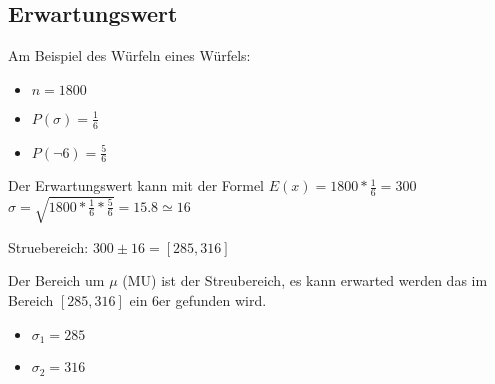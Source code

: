 \newpage
\subsection{Erwartungswert}


Am Beispiel des Würfeln eines Würfels:\\

\begin{itemize}
    \item $n=1800$
    \item $P(\sigma) = \frac{1}{6}$
    \item $P(\lnot 6) = \frac{5}{6}$
\end{itemize}

Der Erwartungswert kann mit der Formel $E(x)=1800 * \frac{1}{6} = 300$\\
$\sigma = \sqrt{1800*\frac{1}{6}*\frac{5}{6}} = 15.8 \simeq 16$

\hfill \break
Struebereich: $300 \pm 16 = \left[285,316\right]$

\hfill \break
Der Bereich um $\mu$ (MU) ist der Streubereich, es kann erwarted werden das im Bereich $\left[285,316\right]$ ein 6er gefunden wird.

\hfill \break
\begin{itemize}
    \item $\sigma_1 = 285$
    \item $\sigma_2 = 316$
\end{itemize}

\hfill \break
{}